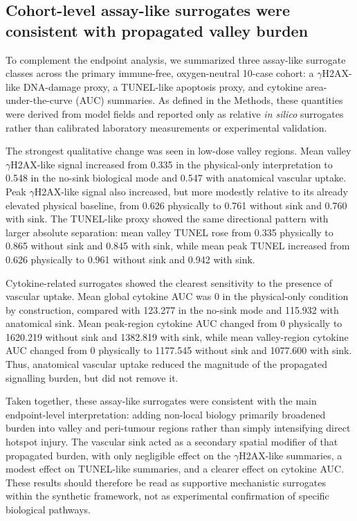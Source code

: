 \documentclass[10pt,a4paper]{article}
\begin{document}
\subsection{Cohort-level assay-like surrogates were consistent with propagated valley burden}

To complement the endpoint analysis, we summarized three assay-like surrogate classes across the primary immune-free, oxygen-neutral 10-case cohort: a $\gamma$H2AX-like DNA-damage proxy, a TUNEL-like apoptosis proxy, and cytokine area-under-the-curve (AUC) summaries. As defined in the Methods, these quantities were derived from model fields and reported only as relative \textit{in silico} surrogates rather than calibrated laboratory measurements or experimental validation.

The strongest qualitative change was seen in low-dose valley regions. Mean valley $\gamma$H2AX-like signal increased from 0.335 in the physical-only interpretation to 0.548 in the no-sink biological mode and 0.547 with anatomical vascular uptake. Peak $\gamma$H2AX-like signal also increased, but more modestly relative to its already elevated physical baseline, from 0.626 physically to 0.761 without sink and 0.760 with sink. The TUNEL-like proxy showed the same directional pattern with larger absolute separation: mean valley TUNEL rose from 0.335 physically to 0.865 without sink and 0.845 with sink, while mean peak TUNEL increased from 0.626 physically to 0.961 without sink and 0.942 with sink.

Cytokine-related surrogates showed the clearest sensitivity to the presence of vascular uptake. Mean global cytokine AUC was 0 in the physical-only condition by construction, compared with 123.277 in the no-sink mode and 115.932 with anatomical sink. Mean peak-region cytokine AUC changed from 0 physically to 1620.219 without sink and 1382.819 with sink, while mean valley-region cytokine AUC changed from 0 physically to 1177.545 without sink and 1077.600 with sink. Thus, anatomical vascular uptake reduced the magnitude of the propagated signalling burden, but did not remove it.

Taken together, these assay-like surrogates were consistent with the main endpoint-level interpretation: adding non-local biology primarily broadened burden into valley and peri-tumour regions rather than simply intensifying direct hotspot injury. The vascular sink acted as a secondary spatial modifier of that propagated burden, with only negligible effect on the $\gamma$H2AX-like summaries, a modest effect on TUNEL-like summaries, and a clearer effect on cytokine AUC. These results should therefore be read as supportive mechanistic surrogates within the synthetic framework, not as experimental confirmation of specific biological pathways.
\end{document}
